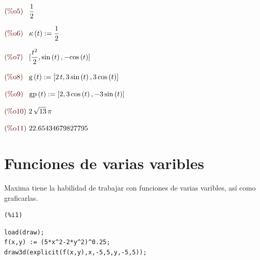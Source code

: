 \documentclass[12pt]{article}
\begin{document}
\begin{math}\displaystyle
\parbox{8ex}{\color{labelcolor}(\%o5) }
\frac{1}{2}
\end{math}

\begin{math}\displaystyle
\parbox{8ex}{\color{labelcolor}(\%o6) }
\kappa\left( t\right) :=\frac{1}{2}
\end{math}

\begin{math}\displaystyle
\parbox{8ex}{\color{labelcolor}(\%o7) }
[\frac{{t}^{2}}{2},\mathrm{sin}\left( t\right) ,-\mathrm{cos}\left( t\right) ]
\end{math}

\begin{math}\displaystyle
\parbox{8ex}{\color{labelcolor}(\%o8) }
\mathrm{g}\left( t\right) :=[2\,t,3\,\mathrm{sin}\left( t\right) ,3\,\mathrm{cos}\left( t\right) ]
\end{math}

\begin{math}\displaystyle
\parbox{8ex}{\color{labelcolor}(\%o9) }
\mathrm{gp}\left( t\right) :=[2,3\,\mathrm{cos}\left( t\right) ,-3\,\mathrm{sin}\left( t\right) ]
\end{math}

\begin{math}\displaystyle
\parbox{8ex}{\color{labelcolor}(\%o10) }
2\,\sqrt{13}\,\pi 
\end{math}

\begin{math}\displaystyle
\parbox{8ex}{\color{labelcolor}(\%o11) }
22.65434679827795
\end{math}
\section{Funciones de varias varibles}
Maxima tiene la habilidad de trabajar con funciones de varias varibles, así como graficarlas.
\noindent
\begin{minipage}[t]{8ex}{\color{red}\bf
\begin{verbatim}
(%i1) 
\end{verbatim}}
\end{minipage}
\begin{minipage}[t]{\textwidth}{\color{blue}
\begin{verbatim}
load(draw);
f(x,y) := (5*x^2-2*y^2)^0.25;
draw3d(explicit(f(x,y),x,-5,5,y,-5,5));
\end{verbatim}}
\end{minipage}
\end{document}
